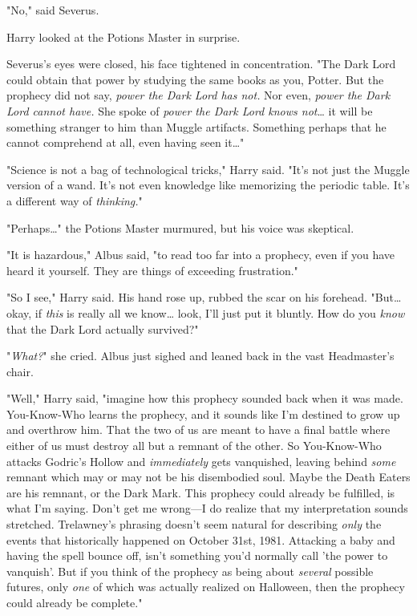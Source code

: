 "No," said Severus.

Harry looked at the Potions Master in surprise.

Severus's eyes were closed, his face tightened in concentration. "The Dark Lord 
could obtain that power by studying the same books as you, Potter. But the 
prophecy did not say, \emph{power the Dark Lord has not.} Nor even, \emph{power 
the Dark Lord cannot have.} She spoke of \emph{power the Dark Lord knows 
not}{\ldots} it will be something stranger to him than Muggle artifacts. 
Something perhaps that he cannot comprehend at all, even having seen it{\ldots}"

"Science is not a bag of technological tricks," Harry said. "It's not just the 
Muggle version of a wand. It's not even knowledge like memorizing the periodic 
table. It's a different way of \emph{thinking.}"

"Perhaps{\ldots}" the Potions Master murmured, but his voice was skeptical.

"It is hazardous," Albus said, "to read too far into a prophecy, even if you 
have heard it yourself. They are things of exceeding frustration."

"So I see," Harry said. His hand rose up, rubbed the scar on his forehead. 
"But{\ldots} okay, if \emph{this} is really all we know{\ldots} look, I'll just 
put it bluntly. How do you \emph{know} that the Dark Lord actually survived?"

"\emph{What?}" she cried. Albus just sighed and leaned back in the vast 
Headmaster's chair.

"Well," Harry said, "imagine how this prophecy sounded back when it was made. 
You-Know-Who learns the prophecy, and it sounds like I'm destined to grow up 
and overthrow him. That the two of us are meant to have a final battle where 
either of us must destroy all but a remnant of the other. So You-Know-Who 
attacks Godric's Hollow and \emph{immediately} gets vanquished, leaving behind 
\emph{some} remnant which may or may not be his disembodied soul. Maybe the 
Death Eaters are his remnant, or the Dark Mark. This prophecy could already be 
fulfilled, is what I'm saying. Don't get me wrong---I do realize that my 
interpretation sounds stretched. Trelawney's phrasing doesn't seem natural for 
describing \emph{only} the events that historically happened on October 31st, 
1981. Attacking a baby and having the spell bounce off, isn't something you'd 
normally call 'the power to vanquish'. But if you think of the prophecy as 
being about \emph{several} possible futures, only \emph{one} of which was 
actually realized on Halloween, then the prophecy could already be complete."

